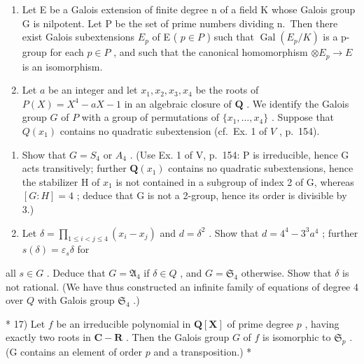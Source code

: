 \begin{enumerate}
\def\labelenumi{\arabic{enumi})}
\setcounter{enumi}{14}
\item
  Let E be a Galois extension of finite degree n of a field K whose Galois group G is nilpotent. Let P be the set of prime numbers dividing n.~Then there exist Galois subextensions \(E_{p}\) of E ( \(p \in P\) ) such that \(\operatorname{Gal}(E_{p}/K)\) is a p-group for each \(p \in P\) , and such that the canonical homomorphism \(\otimes E_{p} \to E\) is an isomorphism.
\item
  Let \(a\) be an integer and let \(x_1, x_2, x_3, x_4\) be the roots of \(P(X) = X^4 - aX - 1\) in an algebraic closure of \(\mathbf{Q}\) . We identify the Galois group \(G\) of \(P\) with a group of permutations of \(\{x_1, \ldots, x_4\}\) . Suppose that \(Q(x_1)\) contains no quadratic subextension (cf.~Ex. 1 of \(V\) , p.~154).
\end{enumerate}

\begin{enumerate}
\def\labelenumi{\alph{enumi})}
\item
  Show that \(G = S_{4}\) or \(A_{4}\) . (Use Ex. 1 of V, p.~154: P is irreducible, hence G acts transitively; further \(\mathbf{Q}(x_{1})\) contains no quadratic subextensions, hence the stabilizer H of \(x_{1}\) is not contained in a subgroup of index 2 of G, whereas \([G:H] = 4\) ; deduce that G is not a 2-group, hence its order is divisible by 3.)
\item
  Let \(\delta = \prod_{1\leqslant i < j\leqslant 4}(x_i - x_j)\) and \(d = \delta^2\) . Show that \(d = 4^4 -3^3 a^4\) ; further \(s(\delta) = \varepsilon_s\delta\) for
\end{enumerate}

all \(s \in G\) . Deduce that \(G = \mathfrak{A}_4\) if \(\delta \in Q\) , and \(G = \mathfrak{S}_4\) otherwise. Show that \(\delta\) is not rational. (We have thus constructed an infinite family of equations of degree 4 over \(Q\) with Galois group \(\mathfrak{S}_4\) .)

* 17) Let \(f\) be an irreducible polynomial in \(\mathbf{Q}[\mathbf{X}]\) of prime degree \(p\) , having exactly two roots in \(\mathbf{C} - \mathbf{R}\) . Then the Galois group \(G\) of \(f\) is isomorphic to \(\mathfrak{S}_p\) . (G contains an element of order \(p\) and a transposition.) *


